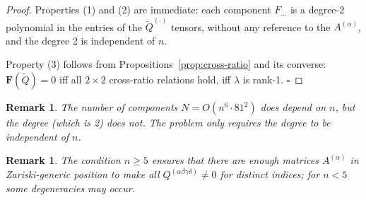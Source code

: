 \documentclass[12pt]{article}
\newtheorem{remark}[theorem]{Remark}
\begin{document}
\begin{proof}
Properties (1) and (2) are immediate: each component $F_{\ldots}$ is a degree-2 polynomial in the entries of the $\tilde{Q}^{(\cdot)}$ tensors, without any reference to the $A^{(\alpha)}$, and the degree 2 is independent of $n$.

Property (3) follows from Propositions~\ref{prop:cross-ratio} and its converse: $\mathbf{F}(\tilde{Q}) = 0$ iff all $2\times 2$ cross-ratio relations hold, iff $\lambda$ is rank-1. \hfill$\square$
\end{proof}

\begin{remark}
The number of components $N = O(n^6 \cdot 81^2)$ does depend on $n$, but the degree (which is 2) does not.  The problem only requires the degree to be independent of $n$.
\end{remark}

\begin{remark}
The condition $n \geq 5$ ensures that there are enough matrices $A^{(\alpha)}$ in Zariski-generic position to make all $Q^{(\alpha\beta\gamma\delta)}\neq 0$ for distinct indices; for $n < 5$ some degeneracies may occur.
\end{remark}
\end{document}
